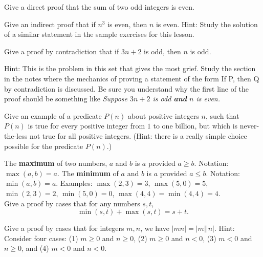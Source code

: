 \begin{prob}
Give a direct proof that the sum of two odd integers is even.
\end{prob} 

\begin{prob}
 Give an  indirect proof that if $n^3$ is even, then $n$ is even. Hint: Study the solution of a similar statement in the sample exercises for this lesson.
\end{prob}


\begin{prob}
 Give a proof by contradiction that if $3n+2$ is odd, then $n$ is odd.

Hint:  This is the problem in this set that gives the most grief.  Study the section
in  the  notes  where  the  mechanics  of  proving  a  statement  of  the  form
If P, then Q by contradiction is discussed.  Be sure you understand why the first line of the proof should be something like {\it Suppose $3n+ 2$ is odd {\bf and} $n$ is even.}
\end{prob}



\begin{prob}
Give an example of a predicate $P(n)$ about positive integers $n$, such that
$P(n)$ is true for every positive integer from $1$ to one billion, but which is 
never-the-less not true for all positive integers. (Hint: there is a really simple choice
possible for the predicate $P(n)$.) 
\end{prob}

\begin{prob}
The {\bfseries maximum} of two numbers, $a$ and $b$ is $a$ provided $a\geq b$. Notation: $\max(a,b) = a$. The {\bfseries minimum}
of $a$ and $b$ is $a$ provided $a\leq b$. Notation: $\min(a,b) = a$.  Examples: $\max(2,3) = 3$, $\max(5,0) = 5$, $\min(2,3) = 2$,
$\min(5,0) = 0$, $\max(4,4) = \min(4,4) = 4$.\\
Give a proof by cases that for any numbers $s,t$,
\[\min(s,t)+\max(s,t) = s+t.\]
\end{prob}

\begin{prob}
Give a proof by cases that for integers $m,n$, we have $|mn|=|m| |n|$.
Hint: Consider four cases: (1) $m\geq 0$ and $n\geq 0$, (2) $m\geq 0$ and $n<0$,
(3) $m<0$ and $n\geq 0$, and (4) $m<0$ and $n<0$.
\end{prob}

